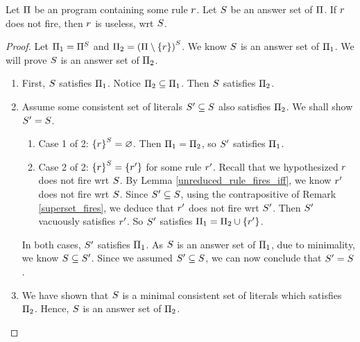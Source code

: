 \documentclass{paper}
\begin{document}
\begin{flushleft}
\begin{remark}
\end{remark}

\begin{lemma}
\label{useless_unless_fires}

Let $\Pi$ be an \ap{} program containing some rule $r$.
Let $S$ be an answer set of $\Pi$.
If $r$ does not fire, then $r$ is useless, wrt $S$.

\end{lemma}

\begin{proof}

Let ${\Pi}_{1} = {\Pi}^{S}$ and
${\Pi}_{2} = {(\Pi \setminus \{r\})}^{S}$.
We know $S$ is an answer set of ${\Pi}_{1}$.
We will prove $S$ is an answer set of ${\Pi}_{2}$.

\begin{enumerate}

\item
First, $S$ satisfies ${\Pi}_{1}$. Notice
${\Pi}_{2} \subseteq {\Pi}_{1}$.
Then $S$ satisfies ${\Pi}_{2}$.

\item
Assume some consistent set of literals
${S}' \subseteq S$ also satisfies ${\Pi}_{2}$.
We shall show ${S}' = S$.
\begin{enumerate}
\item
Case 1 of 2: ${\{r\}}^{S} = \varnothing$.
Then ${\Pi}_{1} = {\Pi}_{2}$, so ${S}'$ satisfies ${\Pi}_{1}$.
\item
Case 2 of 2: ${\{r\}}^{S} = \{{r}'\}$ for
some \dnf{} rule ${r}'$.
Recall that we hypothesized $r$ does not fire wrt
$S$. By Lemma \ref{unreduced_rule_fires_iff}, we know
${r}'$ does not fire wrt $S$.
Since ${S}' \subseteq S$, using the contrapositive of
Remark \ref{superset_fires},
we deduce that ${r}'$ does not fire wrt ${S}'$.
Then ${S}'$ vacuously satisfies ${r}'$.
So ${S}'$ satisfies ${\Pi}_{1} = {\Pi}_{2} \cup \{{r}'\}$.
\end{enumerate}
In both cases, ${S}'$ satisfies ${\Pi}_{1}$.
As $S$ is an answer set of ${\Pi}_{1}$, due to minimality,
we know $S \subseteq {S}'$.
Since we assumed ${S}' \subseteq S$, we can now
conclude that ${S}' = S$.

\item
We have shown that $S$ is a minimal consistent set of
literals which satisfies ${\Pi}_{2}$.
Hence, $S$ is an answer set of ${\Pi}_{2}$.

\end{enumerate}


\end{proof}
\end{flushleft}
\end{document}
